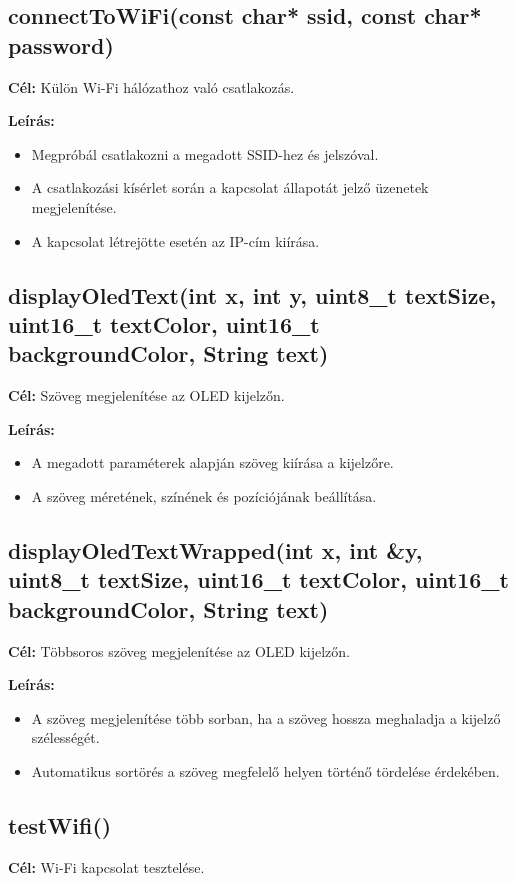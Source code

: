 \subsection{connectToWiFi(const char* ssid, const char* password)}
\textbf{Cél:} Külön Wi-Fi hálózathoz való csatlakozás.

\textbf{Leírás:}
\begin{itemize}
  \item Megpróbál csatlakozni a megadott SSID-hez és jelszóval.
  \item A csatlakozási kísérlet során a kapcsolat állapotát jelző üzenetek megjelenítése.
  \item A kapcsolat létrejötte esetén az IP-cím kiírása.
\end{itemize}

\subsection{displayOledText(int x, int y, uint8\_t textSize, uint16\_t textColor, uint16\_t backgroundColor, String text)}
\textbf{Cél:} Szöveg megjelenítése az OLED kijelzőn.

\textbf{Leírás:}
\begin{itemize}
  \item A megadott paraméterek alapján szöveg kiírása a kijelzőre.
  \item A szöveg méretének, színének és pozíciójának beállítása.
\end{itemize}

\subsection{displayOledTextWrapped(int x, int \&y, uint8\_t textSize, uint16\_t textColor, uint16\_t backgroundColor, String text)}
\textbf{Cél:} Többsoros szöveg megjelenítése az OLED kijelzőn.

\textbf{Leírás:}
\begin{itemize}
  \item A szöveg megjelenítése több sorban, ha a szöveg hossza meghaladja a kijelző szélességét.
  \item Automatikus sortörés a szöveg megfelelő helyen történő tördelése érdekében.
\end{itemize}

\subsection{testWifi()}
\textbf{Cél:} Wi-Fi kapcsolat tesztelése.

